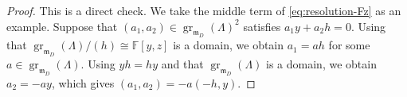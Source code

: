 \documentclass[11pt,a4paper]{article} %
\def\FF{\mathbb{F}}
\def\gr{\operatorname{gr}}
\begin{document}
\begin{proof}
This is a direct check. We take the middle term of \eqref{eq:resolution-Fz} as an example. Suppose that $(a_1,a_2)\in\gr_{\mathfrak{m}_D}(\Lambda)^2$ satisfies $a_1y+a_2h=0$. Using that $\gr_{\mathfrak{m}_D}(\Lambda)/(h)\cong\FF[y,z]$ is a domain, we obtain $a_1=ah$ for some $a\in\gr_{\mathfrak{m}_D}(\Lambda)$. Using $yh=hy$ and that $\gr_{\mathfrak{m}_D}(\Lambda)$ is a domain, we obtain $a_2=-ay$, which gives $(a_1,a_2)=-a(-h,y)$.

\end{proof}
\end{document}
